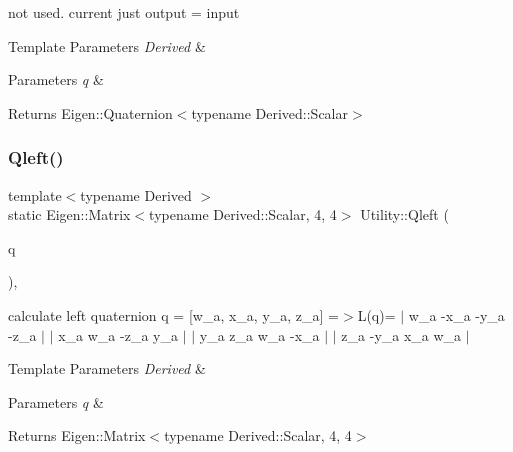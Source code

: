 not used. current just output = input 


\begin{DoxyTemplParams}{Template Parameters}
{\em Derived} & \\
\hline
\end{DoxyTemplParams}

\begin{DoxyParams}{Parameters}
{\em q} & \\
\hline
\end{DoxyParams}
\begin{DoxyReturn}{Returns}
Eigen\+::\+Quaternion$<$typename Derived\+::\+Scalar$>$ 
\end{DoxyReturn}
\mbox{\label{classUtility_a1006727702d0894f4ffbd18081c080a3}} 
\subsubsection{\texorpdfstring{Qleft()}{Qleft()}}
{\footnotesize\ttfamily template$<$typename Derived $>$ \\
static Eigen\+::\+Matrix$<$typename Derived\+::\+Scalar, 4, 4$>$ Utility\+::\+Qleft (\begin{DoxyParamCaption}\item[{const Eigen\+::\+Quaternion\+Base$<$ Derived $>$ \&}]{q }\end{DoxyParamCaption})\hspace{0.3cm}{\ttfamily [inline]}, {\ttfamily [static]}}



calculate left quaternion q = \mbox{[}w\+\_\+a, x\+\_\+a, y\+\_\+a, z\+\_\+a\mbox{]} =$>$L(q)= $\vert$ w\+\_\+a -\/x\+\_\+a -\/y\+\_\+a -\/z\+\_\+a $\vert$ $\vert$ x\+\_\+a w\+\_\+a -\/z\+\_\+a y\+\_\+a $\vert$ $\vert$ y\+\_\+a z\+\_\+a w\+\_\+a -\/x\+\_\+a $\vert$ $\vert$ z\+\_\+a -\/y\+\_\+a x\+\_\+a w\+\_\+a $\vert$ 


\begin{DoxyTemplParams}{Template Parameters}
{\em Derived} & \\
\hline
\end{DoxyTemplParams}

\begin{DoxyParams}{Parameters}
{\em q} & \\
\hline
\end{DoxyParams}
\begin{DoxyReturn}{Returns}
Eigen\+::\+Matrix$<$typename Derived\+::\+Scalar, 4, 4$>$ 
\end{DoxyReturn}
\mbox{\label{classUtility_a65053cec3b81ab32f5e55d1d81f3498a}} 

